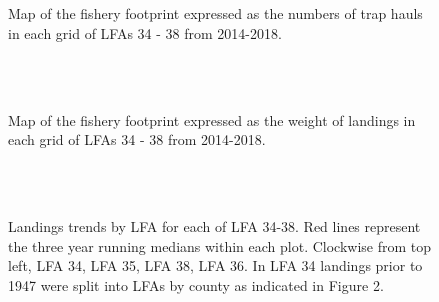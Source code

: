 \documentclass[11pt]{article}
\newcommand{\e}{\string~/bio.data/bio.lobster/figures/LFA3438Framework2019/} %
\begin{document}
\begin{figure}
        \centering
    \\
                \\
        
         \caption{Map of the fishery footprint expressed as the numbers of trap hauls in each grid of LFAs 34 - 38 from 2014-2018.}
        \end{figure}

\begin{figure}
        \centering
    \\
                \\
        
         \caption{Map of the fishery footprint expressed as the weight of landings in each grid of LFAs 34 - 38 from 2014-2018.}
        \end{figure}



\begin{figure}
        \centering
    \\
                \\
                
         \caption{Landings trends by LFA for each of LFA 34-38. Red lines represent the three year running medians within each plot. Clockwise from top left, LFA 34, LFA 35, LFA 38, LFA 36. In LFA 34 landings prior to 1947 were split into LFAs by county as indicated in Figure 2. }
        \end{figure}
\end{document}
